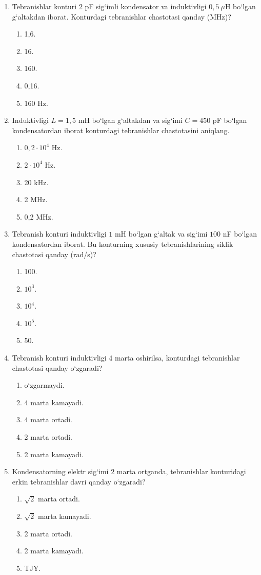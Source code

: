 \begin{enumerate}
\item Tebranishlar konturi $2$ pF sig‘imli kondensator va induktivligi $0,5~\mu$H bo‘lgan g‘altakdan iborat. Konturdagi tebranishlar chastotasi qanday (MHz)?
\begin{enumerate}[label=\Alph*)]
\item 1,6.
\item 16.
\item 160.
\item 0,16.
\item 160 Hz.
\end{enumerate}

\item Induktivligi $L=1,5$ mH bo‘lgan g‘altakdan va sig‘imi $C=450$ pF bo‘lgan kondensatordan iborat konturdagi tebranishlar chastotasini aniqlang.
\begin{enumerate}[label=\Alph*)]
\item $0,2\cdot10^4$ Hz.
\item $2\cdot10^4$ Hz.
\item 20 kHz.
\item 2 MHz.
\item 0,2 MHz.
\end{enumerate}

\item Tebranish konturi induktivligi $1$ mH bo‘lgan g‘altak va sig‘imi $100$ nF bo‘lgan kondensatordan iborat. Bu konturning xususiy tebranishlarining siklik chastotasi qanday (rad/s)?
\begin{enumerate}[label=\Alph*)]
\item 100.
\item $10^3$.
\item $10^4$.
\item $10^5$.
\item 50.
\end{enumerate}

\item Tebranish konturi induktivligi $4$ marta oshirilsa, konturdagi tebranishlar chastotasi qanday o‘zgaradi?
\begin{enumerate}[label=\Alph*)]
\item o‘zgarmaydi.
\item 4 marta kamayadi.
\item 4 marta ortadi.
\item 2 marta ortadi.
\item 2 marta kamayadi.
\end{enumerate}

\item Kondensatorning elektr sig‘imi $2$ marta ortganda, tebranishlar konturidagi erkin tebranishlar davri qanday o‘zgaradi?
\begin{enumerate}[label=\Alph*)]
\item $\sqrt2$ marta ortadi.
\item $\sqrt2$ marta kamayadi.
\item 2 marta ortadi.
\item 2 marta kamayadi.
\item TJY.
\end{enumerate}


\end{enumerate}

